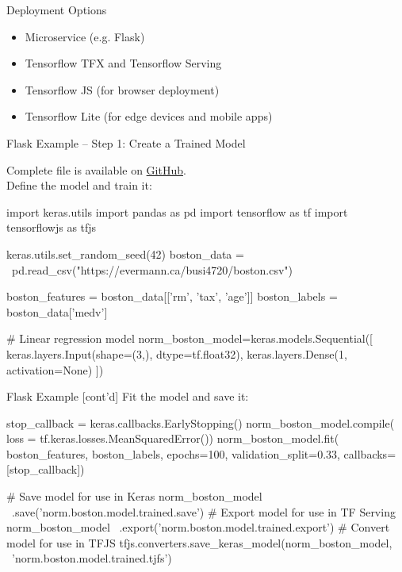 \documentclass[ignorenonframetext,xcolor=x11names]{beamer}
\begin{document}
\begin{frame}{Deployment Options}
\begin{itemize}
   \item Microservice (e.g. Flask)
   \item Tensorflow TFX and Tensorflow Serving 
   \item Tensorflow JS (for browser deployment)
   \item Tensorflow Lite (for edge devices and mobile apps)
\end{itemize}
\end{frame}

\begin{frame}[fragile]{Flask Example -- Step 1: Create a Trained Model} 

Complete file is available on \href{https://github.com/jevermann/busi4720-mlops/blob/main/train_model.py}{GitHub}. \\

Define the model and train it:
\begin{pythoncode}
import keras.utils
import pandas as pd
import tensorflow as tf
import tensorflowjs as tfjs

keras.utils.set_random_seed(42)
boston_data = \
 pd.read_csv("https://evermann.ca/busi4720/boston.csv")

boston_features = boston_data[['rm', 'tax', 'age']]
boston_labels = boston_data['medv']

# Linear regression model
norm_boston_model=keras.models.Sequential([
    keras.layers.Input(shape=(3,), dtype=tf.float32),
    keras.layers.Dense(1, activation=None) ])
\end{pythoncode}
\end{frame}

\begin{frame}[fragile]{Flask Example \small [cont'd]}
Fit the model and save it:
\begin{pythoncode}
stop_callback = keras.callbacks.EarlyStopping()
norm_boston_model.compile(
    loss = tf.keras.losses.MeanSquaredError())
norm_boston_model.fit(
    boston_features, boston_labels,
    epochs=100, validation_split=0.33,
    callbacks=[stop_callback])

# Save model for use in Keras
norm_boston_model \
    .save('norm.boston.model.trained.save')
# Export model for use in TF Serving
norm_boston_model \
    .export('norm.boston.model.trained.export')
# Convert model for use in TFJS
tfjs.converters.save_keras_model(norm_boston_model, \
    'norm.boston.model.trained.tjfs')
\end{pythoncode}
\end{frame}
\end{document}
